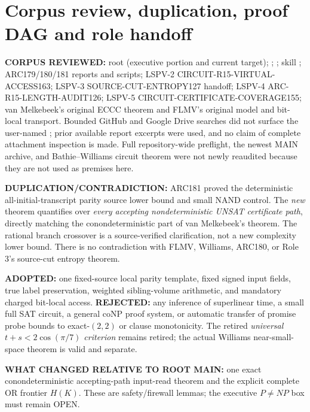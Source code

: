 \documentclass[11pt]{article}
\begin{document}
\section{Corpus review, duplication, proof DAG and role handoff}
\noindent\textbf{CORPUS REVIEWED:} root  (executive portion and current target); ; ; skill ; ARC179/180/181 reports and scripts; LSPV-2 CIRCUIT-R15-VIRTUAL-ACCESS163; LSPV-3 SOURCE-CUT-ENTROPY127 handoff; LSPV-4 ARC-R15-LENGTH-AUDIT126; LSPV-5 CIRCUIT-CERTIFICATE-COVERAGE155; van Melkebeek's original ECCC theorem and FLMV's original model and bit-local transport. Bounded GitHub and Google Drive searches did not surface the user-named ; prior available report excerpts were used, and no claim of complete attachment inspection is made. Full repository-wide preflight, the newest MAIN archive, and Bathie--Williams circuit theorem were not newly reaudited because they are not used as premises here.

\noindent\textbf{DUPLICATION/CONTRADICTION:} ARC181 proved the deterministic all-initial-transcript parity source lower bound and small NAND control. The \emph{new} theorem quantifies over \emph{every accepting nondeterministic UNSAT certificate path}, directly matching the conondeterministic part of van Melkebeek's theorem. The rational branch crossover is a source-verified clarification, not a new complexity lower bound. There is no contradiction with FLMV, Williams, ARC180, or Role 3's source-cut entropy theorem.

\noindent\textbf{ADOPTED:} one fixed-source local parity template, fixed signed input fields, true label preservation, weighted sibling-volume arithmetic, and mandatory charged bit-local access. \textbf{REJECTED:} any inference of superlinear time, a small full SAT circuit, a general coNP proof system, or automatic transfer of promise probe bounds to exact-$(2,2)$ or clause monotonicity. The retired \emph{universal $t+s<2\cos(\pi/7)$ criterion} remains retired; the actual Williams near-small-space theorem is valid and separate.

\noindent\textbf{WHAT CHANGED RELATIVE TO ROOT MAIN:} one exact conondeterministic accepting-path input-read theorem and the explicit complete OR frontier $H(K)$. These are safety/firewall lemmas; the executive $P\ne NP$ box must remain OPEN.
\end{document}
